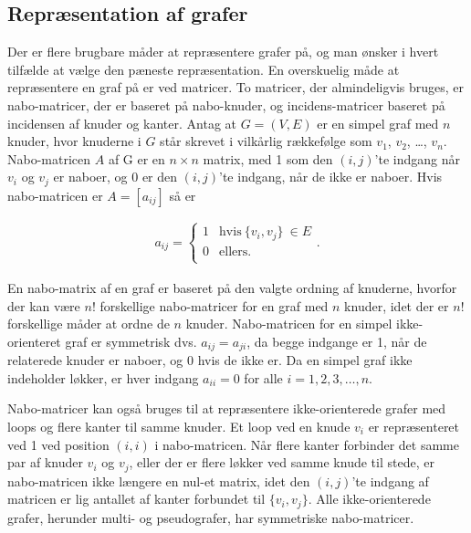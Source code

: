 \subsection{Repræsentation af grafer}

Der er flere brugbare måder at repræsentere grafer på, og man ønsker i hvert tilfælde at vælge den pæneste repræsentation. 
En overskuelig måde at repræsentere en graf på er ved matricer. To matricer, der almindeligvis bruges, er nabo-matricer, der er baseret på nabo-knuder, og incidens-matricer baseret på incidensen af knuder og kanter. 
Antag at $G=(V,E)$ er en simpel graf med $n$ knuder, hvor knuderne i $G$ står skrevet i vilkårlig rækkefølge som $v_1$, $v_2$, \dots , $v_n$. Nabo-matricen $A$  af G er en $n \times n$ matrix, med 1 som den $(i,j)$’te indgang når $v_i$ og $v_j$ er naboer, og 0 er den $(i,j)$’te indgang, når de ikke er naboer. Hvis nabo-matricen er $A=[a_{ij}]$ så er

\begin{align*}
a_{ij}= \left\{\begin{array}{cc}
1 & \textrm{hvis} \  \lbrace v_i, v_j \rbrace \  \in E \\
0 & \textrm{ellers} .\\
\end{array}\right.
.
\end{align*}

\noindent En nabo-matrix af en graf er baseret på den valgte ordning af knuderne, hvorfor der kan være $n!$ forskellige nabo-matricer for en graf med $n$ knuder, idet der er $n!$ forskellige måder at ordne de $n$ knuder. Nabo-matricen for en simpel ikke-orienteret graf er symmetrisk dvs. $a_{ij}=a_{ji}$, da begge indgange er 1, når de relaterede knuder er naboer, og 0 hvis de ikke er. Da en simpel graf ikke indeholder løkker, er hver indgang $a_{ii}=0$ for alle $i=1,2,3, \dots ,n$. 

Nabo-matricer kan også bruges til at repræsentere ikke-orienterede grafer med loops og flere kanter til samme knuder. Et loop ved en knude $v_i$ er repræsenteret ved 1 ved position $(i,i)$ i nabo-matricen. Når flere kanter forbinder det samme par af knuder $v_i$ og $v_j$, eller der er flere løkker ved samme knude til stede, er nabo-matricen ikke længere en nul-et matrix, idet den $(i,j)$’te indgang af matricen er lig antallet af kanter forbundet til $\lbrace v_i,v_j \rbrace$. Alle ikke-orienterede grafer, herunder multi- og pseudografer, har symmetriske nabo-matricer. \\

